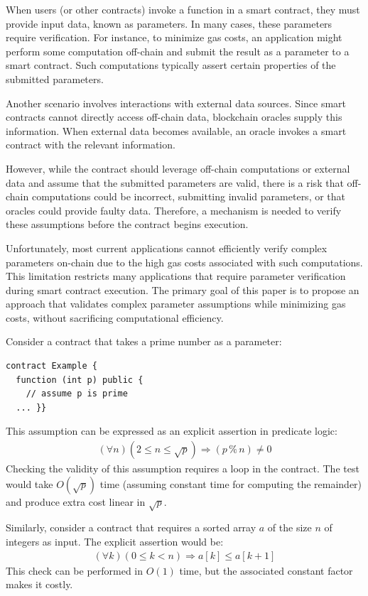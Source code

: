 \documentclass[runningheads]{llncs}
\begin{document}
When users (or other contracts) invoke a function in a smart contract, they must provide input data, known as parameters. In many cases, these parameters require verification. For instance, to minimize gas costs, an application might perform some computation off-chain and submit the result as a parameter to a smart contract. Such computations typically assert certain properties of the submitted parameters.

Another scenario involves interactions with external data sources. Since smart contracts cannot directly access off-chain data, blockchain oracles \cite{blockchain-oracles,oracle-patterns,astraea,chainlink-whitepaper} supply this information. When external data becomes available, an oracle invokes a smart contract with the relevant information.

However, while the contract should leverage off-chain computations or external data and assume that the submitted parameters are valid, there is a risk that off-chain computations could be incorrect, submitting invalid parameters, or that oracles could provide faulty data. Therefore, a mechanism is needed to verify these assumptions before the contract begins execution.

Unfortunately, most current applications cannot efficiently verify complex parameters on-chain due to the high gas costs associated with such computations. This limitation restricts many applications that require parameter verification during smart contract execution. The primary goal of this paper is to propose an approach that validates complex parameter assumptions while minimizing gas costs, without sacrificing computational efficiency.

Consider a contract that takes a prime number as a parameter:
\begin{lstlisting}[numbers=none]
contract Example {
  function (int p) public { 
    // assume p is prime 
  ... }}
\end{lstlisting}
This assumption can be expressed as an explicit assertion in predicate logic:
\begin{gather*}
\label{eq1}
  (\forall n) (2 \leq n \leq \sqrt{p}) \Rightarrow (p \mathbin{\%} n) \ne 0
\end{gather*}
Checking the validity of this assumption requires a loop in the contract. The test would take \(O(\sqrt{p})\) time (assuming constant time for computing the remainder) and produce extra cost linear in \(\sqrt{p}\).

Similarly, consider a contract that requires a sorted array \(a\)  of the size \(n\)  of integers as input. 
The explicit assertion would be:
\begin{gather*}\label{}
  (\forall k) (0\leq k <n) \Rightarrow a[k] \leq a[k+1]
\end{gather*}
This check can be performed in \(O(1)\) time, but the associated constant factor makes it costly.
\end{document}
